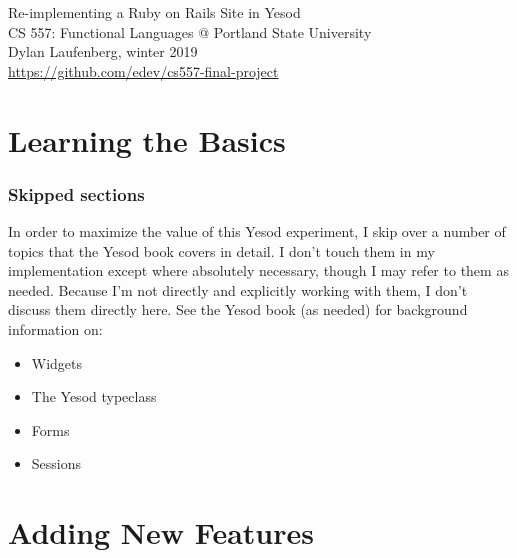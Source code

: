 \documentclass{article}
\begin{document}
\begin{center}
    \Huge Re-implementing a Ruby on Rails Site in Yesod \\
    \large CS 557: Functional Languages @ Portland State University \\
    Dylan Laufenberg, winter 2019 \\
    \normalsize \url{https://github.com/edev/cs557-final-project}
\end{center}



\part{Learning the Basics}





\section{Skipped sections}

In order to maximize the value of this Yesod experiment, I skip over a number of topics that the Yesod book covers in detail. I don't touch them in my implementation except where absolutely necessary, though I may refer to them as needed. Because I'm not directly and explicitly working with them, I don't discuss them directly here. See the Yesod book (as needed) for background information on:

\begin{itemize}
  \item Widgets
  \item The Yesod typeclass
  \item Forms
  \item Sessions
\end{itemize}

\part{Adding New Features}











\newpage
\printbibliography
\end{document}
